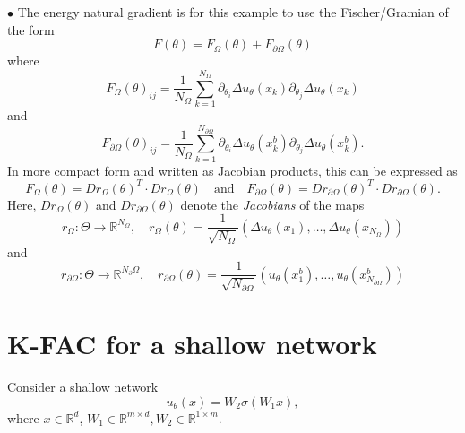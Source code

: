 \documentclass[11pt]{article}
\theoremstyle{definition}
\theoremstyle{plain}
\begin{document}
$\bullet$ The energy natural gradient is for this example to use the Fischer/Gramian of the form
\begin{equation*}
    F(\theta) = F_\Omega(\theta) + F_{\partial\Omega}(\theta)
\end{equation*}
where
\begin{equation}
    F_\Omega(\theta)_{ij} = \frac1{{N_\Omega}} \sum_{k=1}^{N_\Omega} \partial_{\theta_i} \Delta u_\theta(x_k) \partial_{\theta_j} \Delta u_\theta(x_k) 
\end{equation}
and 
\begin{equation}
    F_{\partial\Omega}(\theta)_{ij} = \frac1{{N_\Omega}} \sum_{k=1}^{N_{\partial\Omega}} \partial_{\theta_i} \Delta u_\theta(x_k^b) \partial_{\theta_j} \Delta u_\theta (x_k^b). 
\end{equation}
In more compact form and written as Jacobian products, this can be expressed as 
\begin{equation}\label{eq:Jacobian_Fischer}
    F_\Omega(\theta) = Dr_\Omega(\theta)^T \cdot Dr_\Omega(\theta) 
    \quad \text{and} \quad
    F_{\partial\Omega}(\theta) = Dr_{\partial\Omega}(\theta)^T \cdot Dr_{\partial\Omega}(\theta).
\end{equation}
Here, $Dr_\Omega(\theta)$ and $Dr_{\partial\Omega}(\theta)$  denote the \emph{Jacobians} of the maps
\begin{equation*}
    r_{\Omega}: \Theta \to \mathbb{R}^{N_\Omega}, \quad r_{\Omega}(\theta) = \frac{1}{\sqrt{N_{\Omega}}}(\Delta u_\theta(x_1), \dots, \Delta u_\theta(x_{N_{\Omega}}))
\end{equation*}
and 
\begin{equation*}
    r_{\partial\Omega}: \Theta \to \mathbb{R}^{N_\partial\Omega}, \quad r_{\partial\Omega}(\theta) = \frac{1}{\sqrt{N_{\partial\Omega}}}(u_\theta(x^b_1), \dots, u_\theta(x^b_{N_{\partial\Omega}}))
\end{equation*}



\section{K-FAC for a shallow network}

Consider a shallow network
\[ u_\theta(x) = W_2\sigma(W_1 x), \]
where $x\in\mathbb R^d$, $W_1\in\mathbb R^{m\times d}, W_2\in\mathbb R^{1\times m}$. 
\end{document}
